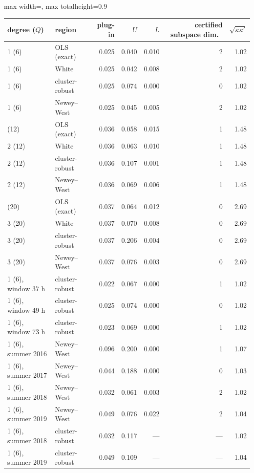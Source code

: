 \begin{table}[!htbp]
\centering\footnotesize
\begin{adjustbox}{max width=\textwidth, max totalheight=0.9\textheight}
\begin{tabular}{llrrrrr}
\toprule
degree ($Q$) & region & plug-in & $U$ & $L$ & certified subspace dim.\ & $\sqrt{\kappa\kappa'}$ \\
\midrule
1 (6) & OLS (exact) & 0.025 & 0.040 & 0.010 & 2 & 1.02 \\
1 (6) & White & 0.025 & 0.042 & 0.008 & 2 & 1.02 \\
1 (6) & cluster-robust & 0.025 & 0.074 & 0.000 & 0 & 1.02 \\
1 (6) & Newey--West & 0.025 & 0.045 & 0.005 & 2 & 1.02 \\
\addlinespace
2 (12) & OLS (exact) & 0.036 & 0.058 & 0.015 & 1 & 1.48 \\
2 (12) & White & 0.036 & 0.063 & 0.010 & 1 & 1.48 \\
2 (12) & cluster-robust & 0.036 & 0.107 & 0.001 & 1 & 1.48 \\
2 (12) & Newey--West & 0.036 & 0.069 & 0.006 & 1 & 1.48 \\
\addlinespace
3 (20) & OLS (exact) & 0.037 & 0.064 & 0.012 & 0 & 2.69 \\
3 (20) & White & 0.037 & 0.070 & 0.008 & 0 & 2.69 \\
3 (20) & cluster-robust & 0.037 & 0.206 & 0.004 & 0 & 2.69 \\
3 (20) & Newey--West & 0.037 & 0.076 & 0.003 & 0 & 2.69 \\
\midrule
1 (6), window 37 h & cluster-robust & 0.022 & 0.067 & 0.000 & 1 & 1.02 \\
1 (6), window 49 h & cluster-robust & 0.025 & 0.074 & 0.000 & 0 & 1.02 \\
1 (6), window 73 h & cluster-robust & 0.023 & 0.069 & 0.000 & 1 & 1.02 \\
\midrule
1 (6), summer 2016 & Newey--West & 0.096 & 0.200 & 0.000 & 1 & 1.07 \\
1 (6), summer 2017 & Newey--West & 0.044 & 0.188 & 0.000 & 0 & 1.03 \\
1 (6), summer 2018 & Newey--West & 0.032 & 0.061 & 0.003 & 2 & 1.02 \\
1 (6), summer 2019 & Newey--West & 0.049 & 0.076 & 0.022 & 2 & 1.04 \\
1 (6), summer 2018 & cluster-robust & 0.032 & 0.117 & --- & --- & 1.02 \\
1 (6), summer 2019 & cluster-robust & 0.049 & 0.109 & --- & --- & 1.04 \\

\end{tabular}
\end{adjustbox}
\end{table}
